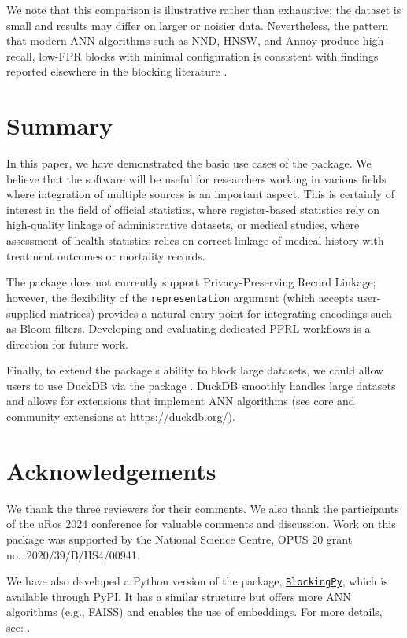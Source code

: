 We note that this comparison is illustrative rather than exhaustive; the dataset is small and results may differ on larger or noisier data. Nevertheless, the pattern that modern ANN algorithms such as NND, HNSW, and Annoy produce high-recall, low-FPR blocks with minimal configuration is consistent with findings reported elsewhere in the blocking literature \citep[cf.~][]{Papadakis2020}.

\section{Summary}\label{summary}

In this paper, we have demonstrated the basic use cases of the
 package. We believe that the software will be useful
for researchers working in various fields where integration of multiple
sources is an important aspect. This is certainly of interest in the
field of official statistics, where register-based statistics rely on
high-quality linkage of administrative datasets, or medical studies,
where assessment of health statistics relies on correct linkage of
medical history with treatment outcomes or mortality records.

The package does not currently support Privacy-Preserving Record Linkage; however,
the flexibility of the \texttt{representation} argument (which accepts user-supplied matrices) provides
a natural entry point for integrating encodings such as Bloom filters.
Developing and evaluating dedicated PPRL workflows is a direction for future work.

Finally, to extend the package's ability to block large datasets, we could allow users to use DuckDB \citep{raasveldt2019duckdb} via the  package \citep{duckdb}. DuckDB smoothly handles large datasets and allows for extensions that implement ANN algorithms (see core and community extensions at \url{https://duckdb.org/}).

\section{Acknowledgements}\label{acknowledgements}

We thank the three reviewers for their comments. We also thank the participants of the uRos 2024 conference for valuable comments and discussion. Work on this package was supported by the National Science Centre, OPUS 20 grant no.~2020/39/B/HS4/00941.

We have also developed a Python version of the package,
\href{https://blockingpy.readthedocs.io/en/latest/}{\texttt{BlockingPy}}, which is
available through PyPI. It has a similar structure but offers more ANN
algorithms (e.g., FAISS) and enables the use of embeddings. For more
details, see: \citet{Strojny2026}.


